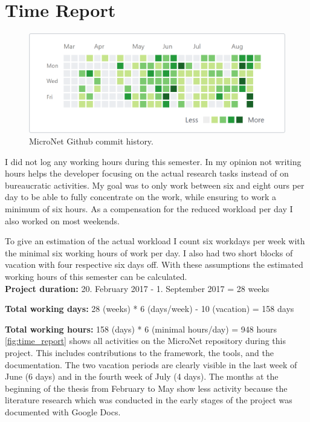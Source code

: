 \chapter{Time Report}

\begin{figure}[H]
  	\centering
  	\includegraphics[width=\textwidth]{images/TimeReport}
  	\caption{MicroNet Github commit history.}
  	\label{fig:time_report}
\end{figure}

I did not log any working hours during this semester. In my opinion not writing
hours helps the developer focusing on the actual research tasks instead of on
bureaucratic activities. My goal was to only work between six and eight ours per
day to be able to fully concentrate on the work, while ensuring to work a
minimum of six hours. As a compensation for the reduced workload per day I also
worked on most weekends.

To give an estimation of the actual workload I count six workdays per week with
the minimal six working hours of work per day. I also had two short blocks of
vacation with four respective six days off. With these assumptions the
estimated working hours of this semester can be calculated.\\

\noindent\textbf{Project duration:} 20. February 2017 - 1. September 2017 = 28
weeks

\noindent\textbf{Total working days:} 28 (weeks) * 6 (days/week) - 10
(vacation) = 158 days

\noindent\textbf{Total working hours:} 158 (days) * 6 (minimal hours/day) = 948
hours\\

\autoref{fig:time_report} shows all activities on the MicroNet repository during
this project. This includes contributions to the framework, the tools, and the
documentation. The two vacation periods are clearly visible in the last week of
June (6 days) and in the fourth week of July (4 days). The months at the
beginning of the thesis from February to May show less activity because the
literature research which was conducted in the early stages of the project was
documented with Google Docs.
